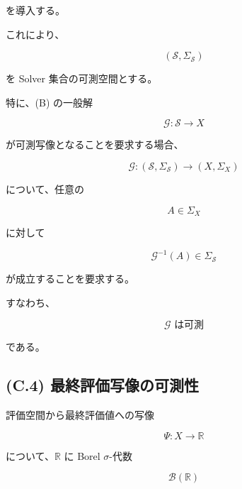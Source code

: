 \documentclass[a4paper,11pt]{article}
\newcommand{\Solver}{\mathcal{S}}
\newcommand{\R}{\mathbb{R}}
\begin{document}
を導入する。

これにより、

\begin{equation}
    \boxed{
        (\Solver,\Sigma_{\Solver})
    }
    \label{eq:C-solver-measurable-space}
\end{equation}

を Solver 集合の可測空間とする。

特に、(B) の一般解

\begin{equation}
    \mathcal{G}:
    \Solver\to X
\end{equation}

が可測写像となることを要求する場合、

\begin{equation}
    \mathcal{G}:
    (\Solver,\Sigma_{\Solver})
    \longrightarrow
    (X,\Sigma_X)
\end{equation}

について、任意の

\begin{equation}
    A\in\Sigma_X
\end{equation}

に対して

\begin{equation}
    \mathcal{G}^{-1}(A)
    \in
    \Sigma_{\Solver}
\end{equation}

が成立することを要求する。

すなわち、

\begin{equation}
    \boxed{
        \mathcal{G}
        \text{ は可測}
    }
    \label{eq:C-G-measurable}
\end{equation}

である。


\subsection{(C.4) 最終評価写像の可測性}
\label{subsec:C4}

評価空間から最終評価値への写像

\begin{equation}
    \Psi:
    X\to\R
\end{equation}

について、$\R$ に Borel $\sigma$-代数

\begin{equation}
    \mathcal{B}(\R)
\end{equation}
\end{document}
